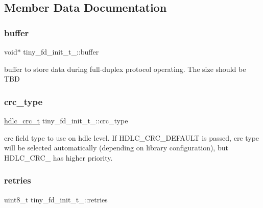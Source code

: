 \subsection{Member Data Documentation}
\mbox{\label{structtiny__fd__init__t___a9a82b8c6c060dbc17022a0c902d436f2}} 
\subsubsection{\texorpdfstring{buffer}{buffer}}
{\footnotesize\ttfamily void$\ast$ tiny\+\_\+fd\+\_\+init\+\_\+t\+\_\+\+::buffer}

buffer to store data during full-\/duplex protocol operating. The size should be T\+BD \mbox{\label{structtiny__fd__init__t___ac69d819ccec020c8382eee492070a85a}} 
\subsubsection{\texorpdfstring{crc\+\_\+type}{crc\_type}}
{\footnotesize\ttfamily \hyperlink{group__HDLC__API_gabb73b32d08d8e79eefe9385634a74bf7}{hdlc\+\_\+crc\+\_\+t} tiny\+\_\+fd\+\_\+init\+\_\+t\+\_\+\+::crc\+\_\+type}

crc field type to use on hdlc level. If H\+D\+L\+C\+\_\+\+C\+R\+C\+\_\+\+D\+E\+F\+A\+U\+LT is passed, crc type will be selected automatically (depending on library configuration), but H\+D\+L\+C\+\_\+\+C\+R\+C\+\_ has higher priority. \mbox{\label{structtiny__fd__init__t___ae366ae6e7626b0d92a6e5088c29169cd}} 
\subsubsection{\texorpdfstring{retries}{retries}}
{\footnotesize\ttfamily uint8\+\_\+t tiny\+\_\+fd\+\_\+init\+\_\+t\+\_\+\+::retries}

